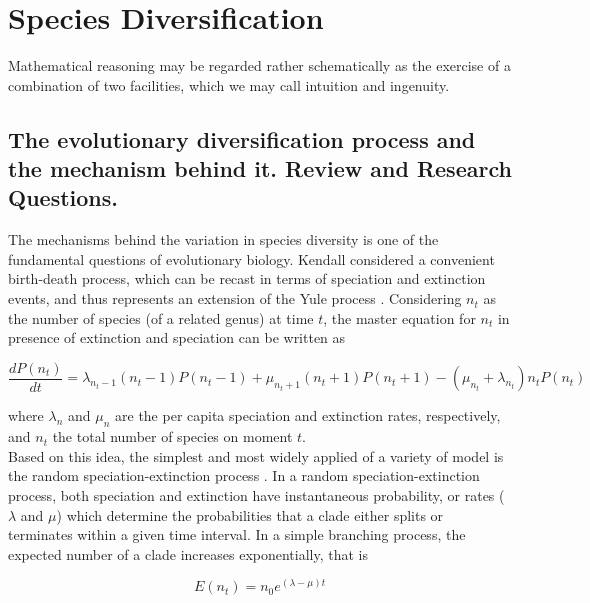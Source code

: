 
\chapter{Species Diversification}

{\color{gray} \begin{fquote}  Mathematical reasoning may be regarded rather schematically as the exercise of a combination of two facilities, which we may call intuition and ingenuity. \end{fquote} }



\section{The evolutionary diversification process and the mechanism behind it. Review and Research Questions.}

The mechanisms behind the variation in species diversity is one of the fundamental questions of evolutionary biology. Kendall \cite{kendall1948some} considered a convenient birth-death process, which can be recast in terms of speciation and extinction events, and thus represents an extension of the Yule process \cite{yule1925mathematical}. Considering $n_t$ as the number of species (of a related genus) at time $t$, the master equation for $n_t$ in presence of extinction and speciation can be written as  

 $$ \frac{dP(n_t)}{dt} = \lambda_{n_t-1}(n_t-1)P(n_t-1)+\mu_{n_t+1}(n_t+1)P(n_t+1)-(\mu_{n_t}+\lambda_{n_t})n_tP(n_t) $$


where $\lambda_n$ and $\mu_n$ are the per capita speciation and extinction rates, respectively, and $n_t$ the total number of species on moment $t$.\\

Based on this idea, the simplest and most widely applied of a variety of model is the random speciation-extinction process \cite{nee1994reconstructed}. In a random speciation-extinction process, both speciation and extinction have instantaneous probability, or rates ($\lambda$ and $\mu$) which determine the probabilities that a clade either splits or terminates within a given time interval. In a simple branching process, the expected number of a clade increases exponentially, that is 

\begin{equation}
 E(n_t) = n_0e^{(\lambda-\mu)t} 
\label{exp1}
\end{equation}

